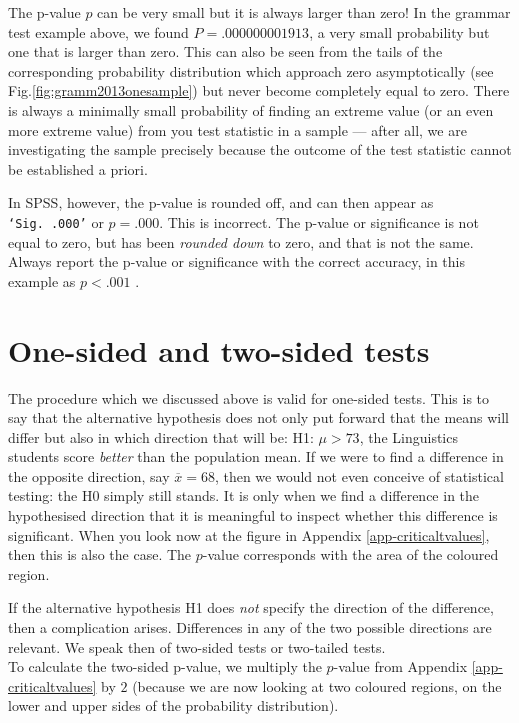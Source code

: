 \documentclass[
]{book}
\begin{document}
The p-value \(p\) can be very small but it is always larger than zero!
In the grammar test example above,
we found \(P=.000000001913\), a very small probability but one that is larger
than zero. This can also be seen from the tails of the corresponding
probability distribution which approach zero asymptotically (see
Fig.\ref{fig:gramm2013onesample}) but never become completely equal
to zero. There is always a minimally small probability of finding
an extreme value (or an even more extreme value) from you test statistic
in a sample --- after all, we are investigating the sample precisely
because the outcome of the test statistic cannot be established a priori.

In SPSS, however, the p-value is rounded off, and can then appear as
\texttt{‘Sig.\ .000’} or \(p=.000\). This is incorrect.
The p-value or significance is not equal to zero, but has
been \emph{rounded down} to zero, and that is not the same.
Always report the p-value or significance with the correct
accuracy, in this example as \(p<.001\) \citep[p.125]{Wright03}.

\hypertarget{sec:ttest-onesidedtwosided}{%
\section{One-sided and two-sided tests}\label{sec:ttest-onesidedtwosided}}

The procedure which we discussed above is valid for one-sided
tests. This is to say that the alternative hypothesis does not only put forward
that the means will differ but also in which direction that will be:
H1: \(\mu >73\), the Linguistics students score \emph{better} than the population
mean. If we were to find a difference in the opposite direction,
say \(\overline{x}=68\), then we would not even conceive of statistical testing:
the H0 simply still stands. It is only when we find a difference
in the hypothesised direction that it is meaningful to inspect whether
this difference is significant. When you look now at the figure in
Appendix \ref{app-criticaltvalues}, then this is also the case. The \(p\)-value
corresponds with the area of the coloured region.

If the alternative hypothesis H1 does \emph{not} specify the direction of the
difference, then a complication arises. Differences in any of the two possible directions
are relevant. We speak then of two-sided tests or two-tailed tests.\\
To calculate the two-sided p-value, we multiply the \(p\)-value from
Appendix \ref{app-criticaltvalues} by \(2\) (because we are now looking at two
coloured regions, on the lower and upper sides of the probability distribution).
\end{document}
